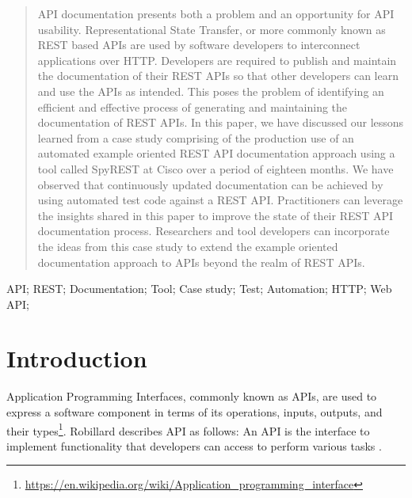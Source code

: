 \documentclass[10pt, conference]{IEEEtran}
\begin{document}




\maketitle


\begin{abstract}
API documentation presents both a problem and an opportunity for API usability. Representational State Transfer, or more commonly known as REST based APIs are used by software developers to interconnect applications over HTTP. Developers are required to publish and maintain the documentation of their REST APIs so that other developers can learn and use the APIs as intended. This poses the problem of identifying an efficient and effective process of generating and maintaining the documentation of REST APIs. In this paper, we have discussed our lessons learned from a case study comprising of the production use of an automated example oriented REST API documentation approach using a tool called SpyREST at Cisco over a period of eighteen months. We have observed that continuously updated documentation can be achieved by using automated test code against a REST API. Practitioners can leverage the insights shared in this paper to improve the state of their REST API documentation process. Researchers and tool developers can incorporate the ideas from this case study to extend the example oriented documentation approach to APIs beyond the realm of REST APIs.

\end{abstract}

\begin{IEEEkeywords}
API; REST; Documentation; Tool; Case study; Test; Automation; HTTP; Web API;

\end{IEEEkeywords}


%
\IEEEpeerreviewmaketitle

\section{Introduction}
Application Programming Interfaces, commonly known as APIs, are used to express a software component in terms of its operations, inputs, outputs, and their types\footnote{\url{https://en.wikipedia.org/wiki/Application_programming_interface}}. Robillard describes API as follows: An API is the interface to implement functionality that developers can access to perform various tasks \cite{Robillard_a_field_study} \cite{Robillard_what_makes}.
\end{document}
